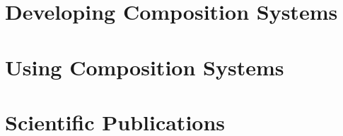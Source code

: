 \documentclass[smallheadings,headsepline,pointlessnumbers,11pt,a4paper]{scrbook}
\begin{document}
\chapter{Developing Composition Systems}


\chapter{Using Composition Systems}


\chapter{Scientific Publications}



%
\end{document}

